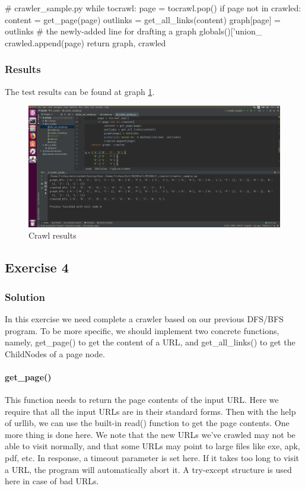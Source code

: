 \documentclass{article}
\begin{document}
\begin{python}
# crawler_sample.py
while tocrawl:
    page = tocrawl.pop()
    if page not in crawled:        
    content = get_page(page)
        outlinks = get_all_links(content)
        graph[page] = outlinks  # the newly-added line for drafting a graph
        globals()['union_%
        crawled.append(page)
return graph, crawled
\end{python}


\subsubsection{Results}

The test results can be found at graph \ref{img:2.1}.

\begin{figure}[htbp]
\centering
\includegraphics[width=13.5cm]{img/test2_1.png}
\caption{Crawl results}
\label{img:2.1}
\end{figure}




\subsection{Exercise 4}

\subsubsection{Solution}

In this exercise we need complete a crawler based on our previous DFS/BFS program. To be more specific, we should implement two concrete functions, namely, get\_page() to get the content of a URL, and get\_all\_links() to get the ChildNodes of a page node.

\paragraph{get\_page()} This function needs to return the page contents of the input URL. Here we require that all the input URLs are in their standard forms. Then with the help of urllib, we can use the built-in read() function to get the page contents. One more thing is done here. We note that the new URLs we've crawled may not be able to visit normally, and that some URLs may point to large files like exe, apk, pdf, etc. In response, a timeout parameter is set here. If it takes too long to visit a URL, the program will automatically abort it. A try-except structure is used here in case of bad URLs.
\end{document}
